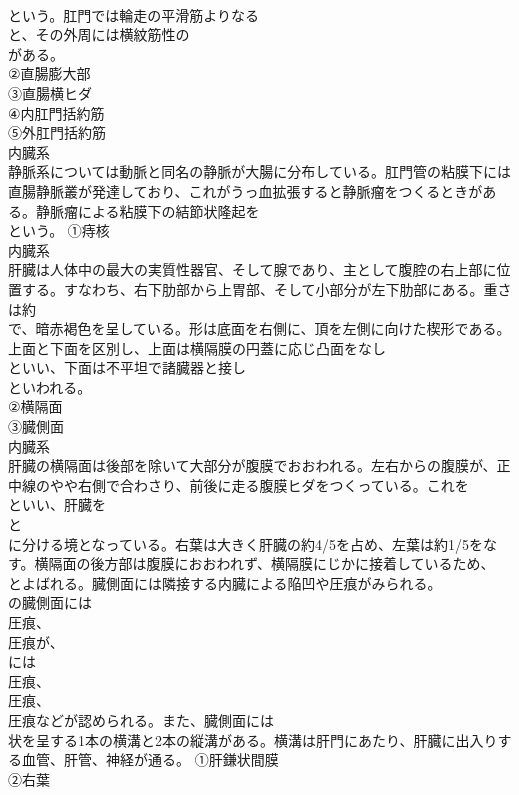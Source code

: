 \documentclass[8pt]{extreport}
\begin{document}
\begin{CJK}{UTF8}{min}
\\	という。肛門では輪走の平滑筋よりなる
\\	と、その外周には横紋筋性の
\\	がある。	
\\	②直腸膨大部
\\	③直腸横ヒダ
\\	④内肛門括約筋
\\	⑤外肛門括約筋
\\	内臓系
\\	静脈系については動脈と同名の静脈が大腸に分布している。肛門管の粘膜下には直腸静脈叢が発達しており、これがうっ血拡張すると静脈瘤をつくるときがある。静脈瘤による粘膜下の結節状隆起を
\\	という。	①痔核
\\	内臓系
\\	肝臓は人体中の最大の実質性器官、そして腺であり、主として腹腔の右上部に位置する。すなわち、右下肋部から上胃部、そして小部分が左下肋部にある。重さは約
\\	で、暗赤褐色を呈している。形は底面を右側に、頂を左側に向けた楔形である。上面と下面を区別し、上面は横隔膜の円蓋に応じ凸面をなし
\\	といい、下面は不平坦で諸臓器と接し
\\	といわれる。	
\\	②横隔面
\\	③臓側面
\\	内臓系
\\	肝臓の横隔面は後部を除いて大部分が腹膜でおおわれる。左右からの腹膜が、正中線のやや右側で合わさり、前後に走る腹膜ヒダをつくっている。これを
\\	といい、肝臓を
\\	と
\\	に分ける境となっている。右葉は大きく肝臓の約4/5を占め、左葉は約1/5をなす。横隔面の後方部は腹膜におおわれず、横隔膜にじかに接着しているため、
\\	とよばれる。臓側面には隣接する内臓による陥凹や圧痕がみられる。
\\	の臓側面には
\\	圧痕、
\\	圧痕が、
\\	には
\\	圧痕、
\\	圧痕、
\\	圧痕などが認められる。また、臓側面には
\\	状を呈する1本の横溝と2本の縦溝がある。横溝は肝門にあたり、肝臓に出入りする血管、肝管、神経が通る。	①肝鎌状間膜
\\	②右葉

\end{CJK}
\end{document}
